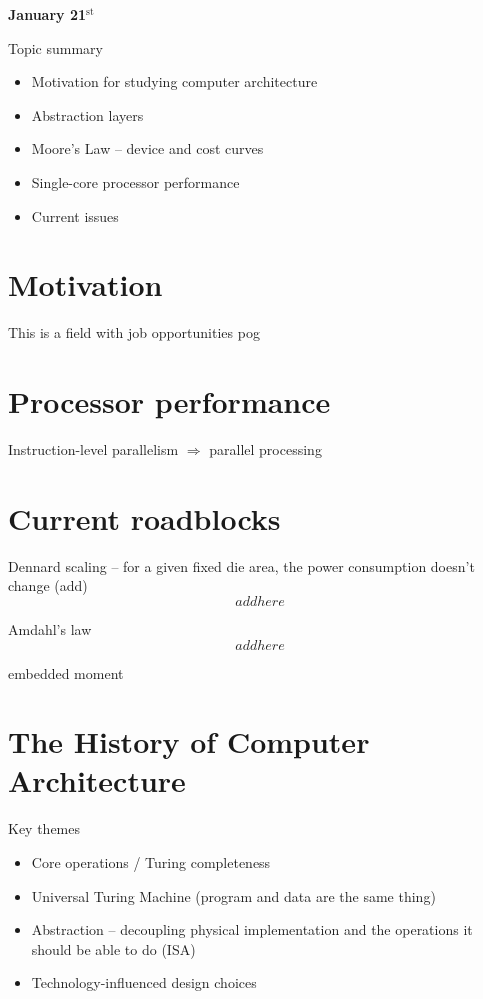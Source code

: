 
\textbf{January 21$^{\text{st}}$}

Topic summary
\begin{itemize}
    \item Motivation for studying computer architecture
    \item Abstraction layers
    \item Moore's Law -- device and cost curves
    \item Single-core processor performance
    \item Current issues
\end{itemize}

\section{Motivation}
This is a field with job opportunities pog


\section{Processor performance}
Instruction-level parallelism $\Rightarrow$ parallel processing


\section{Current roadblocks}
Dennard scaling -- for a given fixed die area, the power consumption doesn't change (add)
$$addhere$$

Amdahl's law
$$addhere$$

embedded moment


\section{The History of Computer Architecture}

Key themes
\begin{itemize}
    \item Core operations / Turing completeness
    \item Universal Turing Machine (program and data are the same thing)
    \item Abstraction -- decoupling physical implementation and the operations it should be able to do (ISA)
    \item Technology-influenced design choices
\end{itemize}



